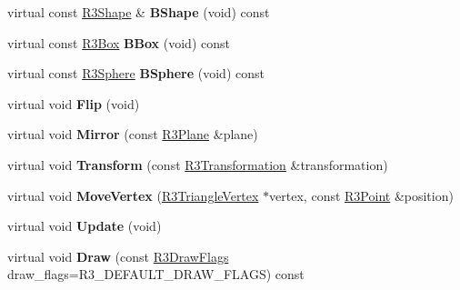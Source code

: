 \begin{DoxyCompactItemize}
\item 
virtual const \hyperlink{class_r3_shape}{R3\+Shape} \& {\bfseries B\+Shape} (void) const \hypertarget{class_r3_triangle_array_a090f43e61b0f881591f3a7fa688d91df}{}\label{class_r3_triangle_array_a090f43e61b0f881591f3a7fa688d91df}

\item 
virtual const \hyperlink{class_r3_box}{R3\+Box} {\bfseries B\+Box} (void) const \hypertarget{class_r3_triangle_array_aa26c191362162ac1f85419ac486f9c4b}{}\label{class_r3_triangle_array_aa26c191362162ac1f85419ac486f9c4b}

\item 
virtual const \hyperlink{class_r3_sphere}{R3\+Sphere} {\bfseries B\+Sphere} (void) const \hypertarget{class_r3_triangle_array_a08350d66fb138655cd1811e1f22e820a}{}\label{class_r3_triangle_array_a08350d66fb138655cd1811e1f22e820a}

\item 
virtual void {\bfseries Flip} (void)\hypertarget{class_r3_triangle_array_a6a5439cb12bf1b6e5c4ea437e7ff9f27}{}\label{class_r3_triangle_array_a6a5439cb12bf1b6e5c4ea437e7ff9f27}

\item 
virtual void {\bfseries Mirror} (const \hyperlink{class_r3_plane}{R3\+Plane} \&plane)\hypertarget{class_r3_triangle_array_ae00d261f6abe5d72690a1badaa031ddb}{}\label{class_r3_triangle_array_ae00d261f6abe5d72690a1badaa031ddb}

\item 
virtual void {\bfseries Transform} (const \hyperlink{class_r3_transformation}{R3\+Transformation} \&transformation)\hypertarget{class_r3_triangle_array_ad2d466e3092fde9e7cd5486730389608}{}\label{class_r3_triangle_array_ad2d466e3092fde9e7cd5486730389608}

\item 
virtual void {\bfseries Move\+Vertex} (\hyperlink{class_r3_triangle_vertex}{R3\+Triangle\+Vertex} $\ast$vertex, const \hyperlink{class_r3_point}{R3\+Point} \&position)\hypertarget{class_r3_triangle_array_a319c25e00c873189f182763e15f31135}{}\label{class_r3_triangle_array_a319c25e00c873189f182763e15f31135}

\item 
virtual void {\bfseries Update} (void)\hypertarget{class_r3_triangle_array_a447f6872fdf2788299fadab4c65f7ef4}{}\label{class_r3_triangle_array_a447f6872fdf2788299fadab4c65f7ef4}

\item 
virtual void {\bfseries Draw} (const \hyperlink{class_r_n_flags}{R3\+Draw\+Flags} draw\+\_\+flags=R3\+\_\+\+D\+E\+F\+A\+U\+L\+T\+\_\+\+D\+R\+A\+W\+\_\+\+F\+L\+A\+GS) const \hypertarget{class_r3_triangle_array_a65a3adab7f799fdbf8ae34309452083b}{}\label{class_r3_triangle_array_a65a3adab7f799fdbf8ae34309452083b}


\end{DoxyCompactItemize}
